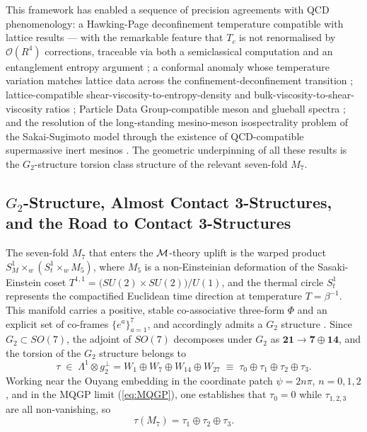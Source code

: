 \documentclass[a4paper,11pt,fleqn]{article}
\theoremstyle{plain}
\theoremstyle{definition}
\begin{document}
This framework has enabled a sequence of precision agreements with QCD phenomenology: a
Hawking-Page deconfinement temperature compatible with lattice results
\cite{Misra:2020rlh,Gopal+Vikas+Aalok} --- with the remarkable feature that $T_c$ is not
renormalised by $\mathcal{O}(R^4)$ corrections, traceable via both a semiclassical
computation \cite{Witten:1998zw} and an entanglement entropy argument
\cite{Klebanov:2007ws,Vikas+Gopal+Aalok}; a conformal anomaly whose temperature variation
matches lattice data across the confinement-deconfinement transition \cite{Misra:2020rlh};
lattice-compatible shear-viscosity-to-entropy-density and bulk-viscosity-to-shear-viscosity
ratios \cite{bulk+gauge_KS+AM,IITR-McGill-bulk-viscosity,zeta-over-eta-int-coupling}; Particle Data Group-compatible
meson and glueball spectra \cite{Vikas+Gopal+Aalok,Sil:2019vbo}; and the
resolution of the long-standing mesino-meson isospectrality problem of the Sakai-Sugimoto
model \cite{SS} through the existence of QCD-compatible supermassive
inert mesinos \cite{Aalok+Gopal-Mesino}. The geometric underpinning of all these results is the
$G_2$-structure torsion class structure of the relevant seven-fold $M_7$.

\subsection{\texorpdfstring{$G_2$}{G2}-Structure, Almost Contact 3-Structures,
and the Road to Contact 3-Structures}

The seven-fold $M_7$ that enters the ${\cal M}$-theory uplift is the warped product
$S^1_M \times_w (S^1_t  \times_w M_5)$, where $M_5$ is a non-Einsteinian
deformation of the Sasaki-Einstein coset
$T^{1,1} = \bigl(SU(2)\times SU(2)\bigr)/U(1)$, and the thermal circle
$S^1_t $ represents the compactified Euclidean time direction at temperature
$T = \beta^{-1}$. This manifold carries a positive, stable co-associative three-form $\Phi$
and an explicit set of co-frames $\{e^a\}_{a=1}^{7}$, and accordingly admits a $G_2$
structure \cite{OR4,NPB}. Since $G_2 \subset SO(7)$, the adjoint of
$SO(7)$ decomposes under $G_2$ as $\mathbf{21} \to \mathbf{7} \oplus \mathbf{14}$, and the
torsion of the $G_2$ structure belongs to
\begin{equation}
\tau \;\in\; \Lambda^1 \otimes g_2^\perp
  = W_1 \oplus W_7 \oplus W_{14} \oplus W_{27}
  \;\equiv\; \tau_0 \oplus \tau_1 \oplus \tau_2 \oplus \tau_3.
\end{equation}
Working near the Ouyang embedding in the coordinate patch $\psi = 2n\pi$, $n = 0,1,2$, and
in the MQGP limit (\ref{eq:MQGP}), one establishes that $\tau_0 = 0$ while $\tau_{1,2,3}$ are all
non-vanishing, so
\begin{equation}
\tau(M_7) = \tau_1 \oplus \tau_2 \oplus \tau_3.
\end{equation}
\end{document}
